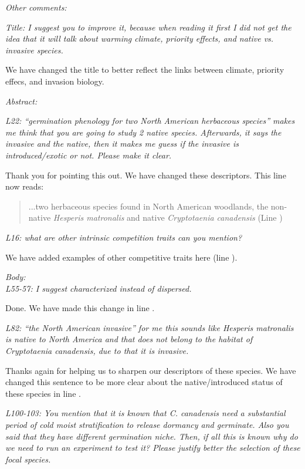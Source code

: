 \documentclass[11pt]{article}
\begin{document}
\emph{Other comments:}

\emph{Title: I suggest you to improve it, because when reading it first I did not get the idea that it will talk about warming climate, priority effects, and native vs. invasive species.}

We have changed the title to  better reflect the links between climate, priority effecs, and invasion biology. 

\emph{ Abstract:} 

\emph{L22: “germination phenology for two North American herbaceous species” makes me think that you are going to study 2 native species. Afterwards, it says the invasive and the native, then it makes me guess if the invasive is introduced/exotic or not. Please make it clear.}

Thank you for pointing this out. We have changed these descriptors. This line now reads:
\begin{quote}...two herbaceous species found in North American woodlands, the non-native \textit{Hesperis matronalis} and native \textit{Cryptotaenia canadensis} (Line ) \end{quote}

\emph{L16: what are other intrinsic competition traits can you mention?}

We have added examples of other competitive traits here (line ). 

\emph{Body:}\\
\emph{L55-57: I suggest characterized instead of dispersed.}

Done. We have made this change in line .

\emph{L82: “the North American invasive” for me this sounds like Hesperis matronalis is native to North America and that does not belong to the habitat of Cryptotaenia canadensis, due to that it is invasive.}

Thanks again for helping us to sharpen our descriptors of these species. We have changed this sentence to be more clear about the native/introduced status of these species in line .

\emph{L100-103: You mention that it is known that C. canadensis need a substantial period of cold moist stratification to release dormancy and germinate. Also you said that they have different germination niche. Then, if all this is known why do we need to run an experiment to test it? Please justify better the selection of these focal species.}
\end{document}

